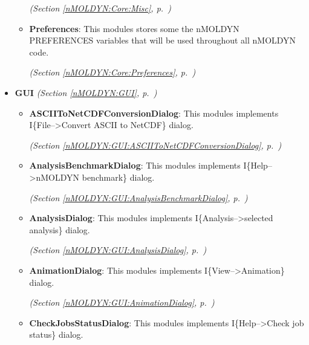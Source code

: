 \begin{itemize}
\begin{itemize}
  \textit{(Section \ref{nMOLDYN:Core:Misc}, p.~\pageref{nMOLDYN:Core:Misc})}

    \item \textbf{Preferences}: This modules stores some the nMOLDYN PREFERENCES variables that will be 
used throughout all nMOLDYN code.



  \textit{(Section \ref{nMOLDYN:Core:Preferences}, p.~\pageref{nMOLDYN:Core:Preferences})}

  \end{itemize}
\item \textbf{GUI}
  \textit{(Section \ref{nMOLDYN:GUI}, p.~\pageref{nMOLDYN:GUI})}

  \begin{itemize}
\setlength{\parskip}{0ex}
    \item \textbf{ASCIIToNetCDFConversionDialog}: This modules implements I\{File--{\textgreater}Convert ASCII to NetCDF\} dialog.



  \textit{(Section \ref{nMOLDYN:GUI:ASCIIToNetCDFConversionDialog}, p.~\pageref{nMOLDYN:GUI:ASCIIToNetCDFConversionDialog})}

    \item \textbf{AnalysisBenchmarkDialog}: This modules implements I\{Help--{\textgreater}nMOLDYN benchmark\} dialog.



  \textit{(Section \ref{nMOLDYN:GUI:AnalysisBenchmarkDialog}, p.~\pageref{nMOLDYN:GUI:AnalysisBenchmarkDialog})}

    \item \textbf{AnalysisDialog}: This modules implements I\{Analysis--{\textgreater}selected analysis\} dialog.



  \textit{(Section \ref{nMOLDYN:GUI:AnalysisDialog}, p.~\pageref{nMOLDYN:GUI:AnalysisDialog})}

    \item \textbf{AnimationDialog}: This modules implements I\{View--{\textgreater}Animation\} dialog.



  \textit{(Section \ref{nMOLDYN:GUI:AnimationDialog}, p.~\pageref{nMOLDYN:GUI:AnimationDialog})}

    \item \textbf{CheckJobsStatusDialog}: This modules implements I\{Help--{\textgreater}Check job status\} dialog.




\end{itemize}
\end{itemize}

